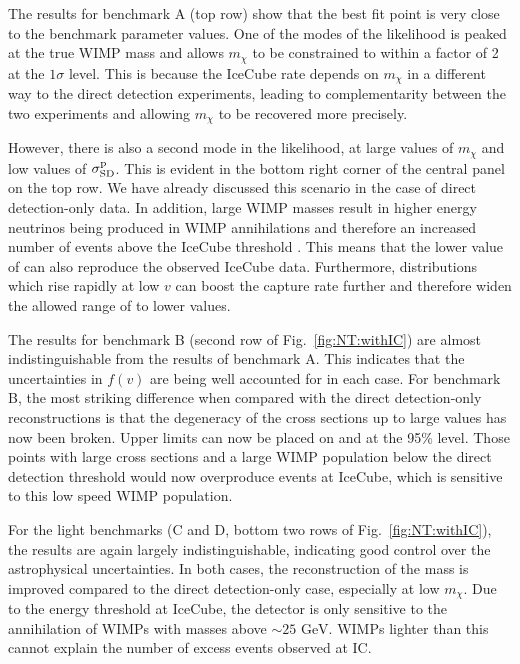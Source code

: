 The results for benchmark A (top row) show that the best fit point is very close to the benchmark parameter values. One of the modes of the likelihood is peaked at the true WIMP mass and allows $m_\chi$ to be constrained to within a factor of 2 at the $1\sigma$ level. This is because the IceCube rate depends on $m_\chi$ in a different way to the direct detection experiments, leading to complementarity between the two experiments and allowing $m_\chi$ to be recovered more precisely.

However, there is also a second mode in the likelihood, at large values of $m_\chi$ and low values of $\sigmapsd$. This is evident in the bottom right corner of the central panel on the top row. We have already discussed this scenario in the case of direct detection-only data. In addition, large WIMP masses result in higher energy neutrinos being produced in WIMP annihilations and therefore an increased number of events above the IceCube threshold \cite{Arina:2013}. This means that the lower value of \sigmapsd can also reproduce the observed IceCube data. Furthermore, distributions which rise rapidly at low $v$ can boost the capture rate further and therefore widen the allowed range of \sigmapsd to lower values.

The results for benchmark B (second row of Fig.~\ref{fig:NT:withIC}) are almost indistinguishable from the results of benchmark A. This indicates that the uncertainties in $f(v)$ are being well accounted for in each case. For benchmark B, the most striking difference when compared with the direct detection-only reconstructions is that the degeneracy of the cross sections up to large values has now been broken. Upper limits can now be placed on \sigmapsi and \sigmapsd at the 95\% level. Those points with large cross sections and a large WIMP population below the direct detection threshold would now overproduce events at IceCube, which is sensitive to this low speed WIMP population.


For the light benchmarks (C and D, bottom two rows of Fig.~\ref{fig:NT:withIC}), the results are again largely indistinguishable, indicating good control over the astrophysical uncertainties. In both cases, the reconstruction of the mass is improved compared to the direct detection-only case, especially at low $m_\chi$. Due to the energy threshold at IceCube, the detector is only sensitive to the annihilation of WIMPs with masses above $\sim 25 \textrm{ GeV}$. WIMPs lighter than this cannot explain the number of excess events observed at IC.

